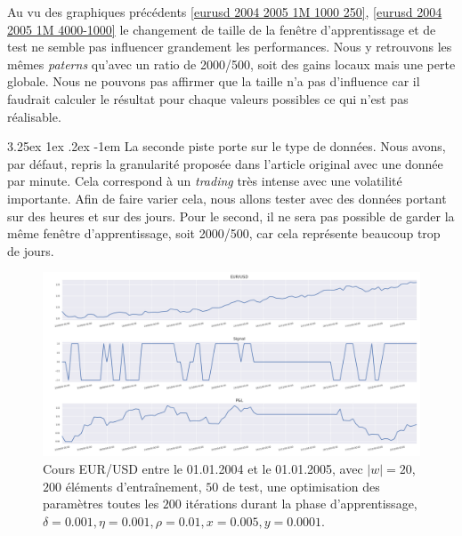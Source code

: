 \documentclass[a4paper, 11pt]{article}
\makeatletter
\renewcommand\paragraph{\@startsection{paragraph}{5}{\z@}%
  {3.25ex \@plus1ex \@minus.2ex}%
  {-1em}%
  {\normalfont\normalsize\bfseries}}
\makeatother
\begin{document}
Au vu des graphiques précédents \ref{eurusd 2004 2005 1M 1000 250}, \ref{eurusd 2004 2005 1M 4000-1000} le changement de taille de la fenêtre d'apprentissage et de test ne semble pas influencer grandement les performances. Nous y retrouvons les mêmes \textit{paterns} qu'avec un ratio de 2000/500, soit des gains locaux mais une perte globale. Nous ne pouvons pas affirmer que la taille n'a pas d'influence car il faudrait calculer le résultat pour chaque valeurs possibles ce qui n'est pas réalisable.

\paragraph{}
La seconde piste porte sur le type de données. Nous avons, par défaut, repris la granularité proposée dans l'article original avec une donnée par minute. Cela correspond à un \textit{trading} très intense avec une volatilité importante. Afin de faire varier cela, nous allons tester avec des données portant sur des heures et sur des jours. Pour le second, il ne sera pas possible de garder la même fenêtre d'apprentissage, soit 2000/500, car cela représente beaucoup trop de jours.

\begin{figure}
	\centering
	\includegraphics[scale=0.5]{res/eursud_2004-2005-days}
	\caption{Cours EUR/USD entre le 01.01.2004 et le 01.01.2005, avec $|w| = 20$, $200$ éléments d'entraînement, $50$ de test, une optimisation des
		paramètres toutes les $200$ itérations durant la phase d'apprentissage, $\delta = 0.001, \eta=0.001,\rho=0.01, x = 0.005, y=0.0001$.}
\end{figure}
\end{document}
